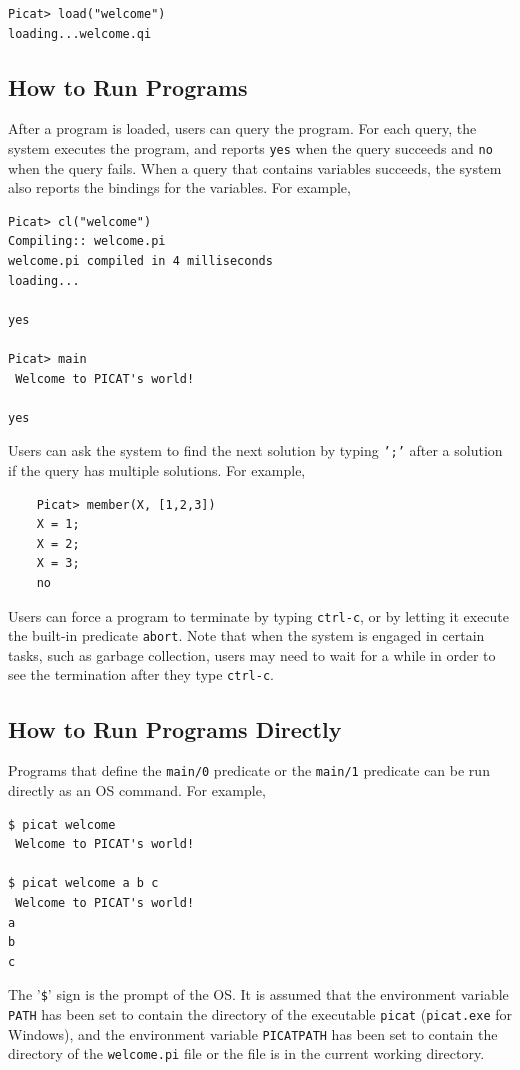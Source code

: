 \begin{itemize}
\begin{verbatim}
Picat> load("welcome")
loading...welcome.qi
\end{verbatim}
\end{itemize}

\subsection{How to Run Programs}
After a program is loaded, users can query the program. For each query, the system executes the program, and reports \texttt{yes} when the query succeeds and \texttt{no} when the query fails. When a query that contains variables succeeds, the system also reports the bindings for the variables. For example,

\begin{verbatim}
Picat> cl("welcome")
Compiling:: welcome.pi
welcome.pi compiled in 4 milliseconds
loading...

yes

Picat> main
 Welcome to PICAT's world! 
 
yes
\end{verbatim}

Users can ask the system to find the next solution by typing \texttt{';'} after a solution if the query has multiple solutions. For example,
\begin{verbatim}
    Picat> member(X, [1,2,3])
    X = 1;
    X = 2;
    X = 3;
    no
\end{verbatim}
Users can force a program to terminate by typing \texttt{ctrl-c}, or by letting it execute the built-in predicate \texttt{abort}. Note that when the system is engaged in certain tasks, such as garbage collection, users may need to wait for a while in order to see the termination after they type \texttt{ctrl-c}.

\subsection{How to Run Programs Directly}
Programs that define the \texttt{main/0} predicate or the \texttt{main/1} predicate can be run directly as an OS command. For example,
\begin{verbatim}
$ picat welcome
 Welcome to PICAT's world!

$ picat welcome a b c
 Welcome to PICAT's world!
a
b
c
\end{verbatim}
The\/ '{\texttt \$}' sign is the prompt of the OS. It is assumed that the environment variable \texttt{PATH} has been set to contain the directory of the executable \texttt{picat} (\texttt{picat.exe} for Windows), and the environment variable \texttt{PICATPATH} has been set to contain the directory of the \texttt{welcome.pi} file or the file is in the current working directory.

